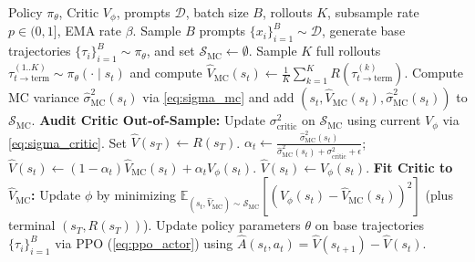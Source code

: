 \documentclass[11pt,a4paper]{article}
\newcommand{\E}{\mathbb{E}}
\newcommand{\Vmc}{\hat{V}_{\text{MC}}}
\begin{document}
\begin{algorithm}[H]
\caption{Variant 2: Fitted Vine Interpolation \& Subsampled PPO}
\label{alg:fitted_vine}
\begin{algorithmic}[1]
\Require Policy $\pi_\theta$, Critic $V_\phi$, prompts $\mathcal{D}$, batch size $B$, rollouts $K$, subsample rate $p \in (0, 1]$, EMA rate $\beta$.
    \State Sample $B$ prompts $\{x_i\}_{i=1}^B \sim \mathcal{D}$, generate base trajectories $\{\tau_i\}_{i=1}^B \sim \pi_\theta$, and set $\mathcal{S}_{\text{MC}} \leftarrow \emptyset$.
            \State Sample $K$ full rollouts $\tau_{t \to \text{term}}^{(1..K)} \sim \pi_\theta(\cdot \mid s_t)$ and compute $\Vmc(s_t) \leftarrow \frac{1}{K}\sum_{k=1}^K R(\tau_{t \to \text{term}}^{(k)})$.
            \State Compute MC variance $\hat{\sigma}^2_{\text{MC}}(s_t)$ via \cref{eq:sigma_mc} and add $(s_t, \Vmc(s_t), \hat{\sigma}^2_{\text{MC}}(s_t))$ to $\mathcal{S}_{\text{MC}}$.
        \EndIf
    \EndFor
    \State \textbf{Audit Critic Out-of-Sample:} Update $\sigma^2_{\text{critic}}$ on $\mathcal{S}_{\text{MC}}$ using current $V_\phi$ via \cref{eq:sigma_critic}.
        \State Set $\hat{V}(s_T) \leftarrow R(s_T)$.
                \State $\alpha_t \leftarrow \frac{\hat{\sigma}^2_{\text{MC}}(s_t)}{\hat{\sigma}^2_{\text{MC}}(s_t) + \sigma^2_{\text{critic}} + \epsilon}$; \quad $\hat{V}(s_t) \leftarrow (1 - \alpha_t)\Vmc(s_t) + \alpha_t V_\phi(s_t)$.
            \Else
                \State $\hat{V}(s_t) \leftarrow V_\phi(s_t)$.
            \EndIf
        \EndFor
    \EndFor
    \State \textbf{Fit Critic to $\Vmc$:} Update $\phi$ by minimizing $\E_{(s_t, \Vmc) \sim \mathcal{S}_{\text{MC}}}\!\left[(V_\phi(s_t) - \Vmc(s_t))^2\right]$ (plus terminal $(s_T, R(s_T))$).
    \State Update policy parameters $\theta$ on base trajectories $\{\tau_i\}_{i=1}^B$ via PPO (\cref{eq:ppo_actor}) using $\hat{A}(s_t, a_t) = \hat{V}(s_{t+1}) - \hat{V}(s_t)$.
\EndFor
\end{algorithmic}
\end{algorithm}
\end{document}
